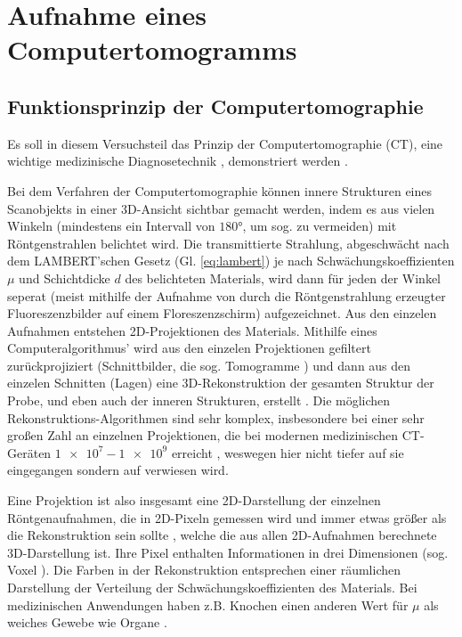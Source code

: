 \chapter{Aufnahme eines Computertomogramms} \label{sec:ct_chapter}

\section{Funktionsprinzip der Computertomographie}

Es soll in diesem Versuchsteil das Prinzip der Computertomographie (CT), eine wichtige medizinische Diagnosetechnik \cite[154]{medizinphysik}, demonstriert werden \cite[2]{529va}.


Bei dem Verfahren der Computertomographie können innere Strukturen eines Scanobjekts in einer 3D-Ansicht sichtbar gemacht werden, indem es aus vielen Winkeln (mindestens ein Intervall von $\ang{180}$, um sog.  zu vermeiden) mit Röntgenstrahlen belichtet wird. Die transmittierte Strahlung, abgeschwächt nach dem \uppercase{Lambert}'schen Gesetz (Gl. \ref{eq:lambert}) je nach Schwächungskoeffizienten $\mu$ und Schichtdicke $d$ des belichteten Materials, wird dann für jeden der Winkel seperat (meist mithilfe der Aufnahme von durch die Röntgenstrahlung erzeugter Fluoreszenzbilder auf einem Floreszenzschirm) aufgezeichnet. Aus den einzelen Aufnahmen entstehen 2D-Projektionen des Materials. Mithilfe eines Computeralgorithmus' wird aus den einzelen Projektionen gefiltert zurückprojiziert (Schnittbilder, die sog. Tomogramme \cite[165]{medizinphysik}) und dann aus den einzelen Schnitten (Lagen) eine 3D-Rekonstruktion der gesamten Struktur der Probe, und eben auch der inneren Strukturen, erstellt \cite[5-6]{LDctmodul}. Die möglichen Rekonstruktions-Algorithmen sind sehr komplex, insbesondere bei einer sehr großen Zahl an einzelnen Projektionen, die bei modernen medizinischen CT-Geräten $\num{1e7}-\num{1e9}$ erreicht \cite[166]{medizinphysik}, weswegen hier nicht tiefer auf sie eingegangen sondern auf \cite[Kap. 8.3]{medizinphysik} verwiesen wird.


Eine Projektion ist also insgesamt eine 2D-Darstellung der einzelnen Röntgenaufnahmen, die in 2D-Pixeln gemessen wird und immer etwas größer als die Rekonstruktion sein sollte \cite[4]{LDctmodul}, welche die aus allen 2D-Aufnahmen berechnete 3D-Darstellung ist. Ihre Pixel enthalten Informationen in drei Dimensionen (sog. Voxel \cite[166]{medizinphysik}). Die Farben in der Rekonstruktion entsprechen einer räumlichen Darstellung der Verteilung der Schwächungskoeffizienten des Materials. Bei medizinischen Anwendungen haben z.B. Knochen einen anderen Wert für $\mu$ als weiches Gewebe wie Organe \cite[156-157]{medizinphysik}.

